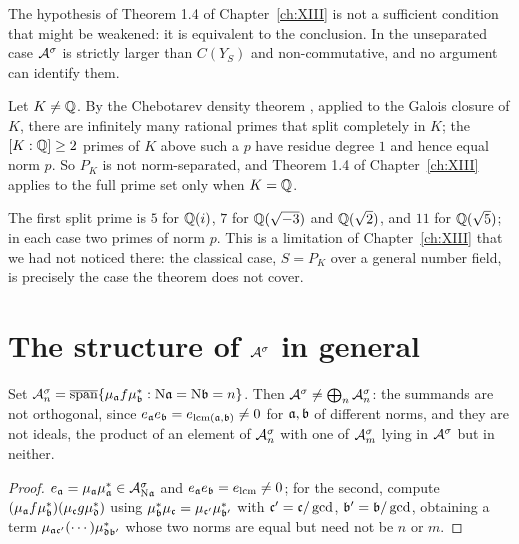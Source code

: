 \begin{corollary}\label{XIV:cor:nothing}
The hypothesis of Theorem 1.4 of Chapter~\ref{ch:XIII} is not a sufficient condition that might be
weakened: it is equivalent to the conclusion. In the unseparated case $\mathcal{A}^\sigma$ is strictly
larger than $C(Y_S)$ and non-commutative, and no argument can identify them.
\end{corollary}

\begin{proposition}\label{XIV:prop:PK}
Let $K\ne\mathbb{Q}$. By the Chebotarev density theorem \cite[Ch.~VII, \S13]{Neukirch}, applied to
the Galois closure of $K$, there are infinitely many rational primes that split completely
in $K$; the $[K:\mathbb{Q}]\ge2$ primes of $K$ above such a $p$ have residue degree $1$ and hence
equal norm $p$. So $P_K$ is not norm-separated, and Theorem 1.4 of Chapter~\ref{ch:XIII} applies to
the full prime set only when $K=\mathbb{Q}$.
\end{proposition}

\begin{remark}\label{XIV:rem:num}
The first split prime is $5$ for $\mathbb{Q}(i)$, $7$ for $\mathbb{Q}(\sqrt{-3})$ and $\mathbb{Q}(\sqrt2)$, and $11$
for $\mathbb{Q}(\sqrt5)$; in each case two primes of norm $p$. This is a limitation of Chapter~\ref{ch:XIII}
that we had not noticed there: the classical case, $S=P_K$ over a general
number field, is precisely the case the theorem does not cover.
\end{remark}

\section{The structure of $\mathcal{A}^\sigma$ in general}

\begin{proposition}\label{XIV:prop:notsum}
Set $\mathcal{A}_n^\sigma=\overline{\operatorname{span}}\{\mu_{\mathfrak{a}} f\mu_{\mathfrak{b}}^*:\mathrm{N}\mathfrak{a}=\mathrm{N}\mathfrak{b}=n\}$. Then
$\mathcal{A}^\sigma\ne\bigoplus_n\mathcal{A}_n^\sigma$: the summands are not orthogonal, since
$e_{\mathfrak{a}} e_{\mathfrak{b}}=e_{\mathrm{lcm}(\mathfrak{a},\mathfrak{b})}\ne0$ for $\mathfrak{a},\mathfrak{b}$ of different norms, and they are
not ideals, the product of an element of $\mathcal{A}_n^\sigma$ with one of $\mathcal{A}_m^\sigma$ lying in
$\mathcal{A}^\sigma$ but in neither.
\end{proposition}

\begin{proof}
$e_{\mathfrak{a}}=\mu_{\mathfrak{a}}\mu_{\mathfrak{a}}^*\in\mathcal{A}^\sigma_{\mathrm{N}\mathfrak{a}}$ and $e_{\mathfrak{a}} e_{\mathfrak{b}}=e_{\mathrm{lcm}}\ne0$;
for the second, compute
$(\mu_{\mathfrak{a}} f\mu_{\mathfrak{b}}^*)(\mu_{\mathfrak{c}} g\mu_{\mathfrak{d}}^*)$ using $\mu_{\mathfrak{b}}^*\mu_{\mathfrak{c}}=\mu_{\mathfrak{c}'}\mu_{\mathfrak{b}'}^*$
with $\mathfrak{c}'=\mathfrak{c}/\gcd$, $\mathfrak{b}'=\mathfrak{b}/\gcd$, obtaining a term
$\mu_{\mathfrak{a}\mathfrak{c}'}(\cdots)\mu_{\mathfrak{d}\mathfrak{b}'}^*$ whose two norms are equal but need not be $n$ or $m$.
\end{proof}

